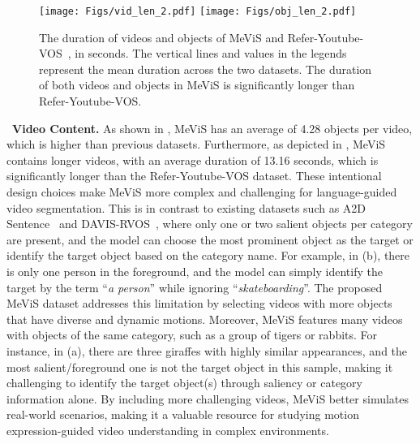 \documentclass[10pt,twocolumn,letterpaper]{article}
\newcommand{\ourdataset}{MeViS\xspace}
\begin{document}
\begin{figure}
    \centering
    \hspace{-5mm}
    \texttt{[image: Figs/vid\_len\_2.pdf]}
    \hspace{-3mm}
    \texttt{[image: Figs/obj\_len\_2.pdf]}
    \hspace{-4mm}
    \vspace{-3mm}
    \caption{The duration of videos and objects of \ourdataset and Refer-Youtube-VOS~\cite{seo2020urvos}, in seconds. The vertical lines and values in the legends represent the mean duration across the two datasets. The duration of both videos and objects in \ourdataset is significantly longer than Refer-Youtube-VOS.}
    \label{fig:VideoContent2}
    \vspace{-5mm}
\end{figure}

\vspace{0.6mm}
\noindent~\textbf{Video Content.} As shown in , \ourdataset has an average of 4.28 objects per video, which is higher than previous datasets. Furthermore, as depicted in , \ourdataset contains longer videos, with an average duration of 13.16 seconds, which is significantly longer than the Refer-Youtube-VOS dataset. These intentional design choices make \ourdataset more complex and challenging for language-guided video segmentation. This is in contrast to existing datasets such as A2D Sentence~\cite{gavrilyuk2018actor} and DAVIS-RVOS~\cite{khoreva2018video}, where only one or two salient objects per category are present, and the model can choose the most prominent object as the target or identify the target object based on the category name. For example, in (b), there is only one person in the foreground, and the model can simply identify the target by the term {``\textit{a person}''} while ignoring {``\textit{skateboarding}''}. The proposed \ourdataset dataset addresses this limitation by selecting videos with more objects that have diverse and dynamic motions. Moreover, \ourdataset features many videos with objects of the same category, such as a group of tigers or rabbits. For instance, in (a), there are three giraffes with highly similar appearances, and the most salient/foreground one is not the target object in this sample, making it challenging to identify the target object(s) through saliency or category information alone. By including more challenging videos, \ourdataset better simulates real-world scenarios, making it a valuable resource for studying motion expression-guided video understanding in complex environments.
\end{document}
